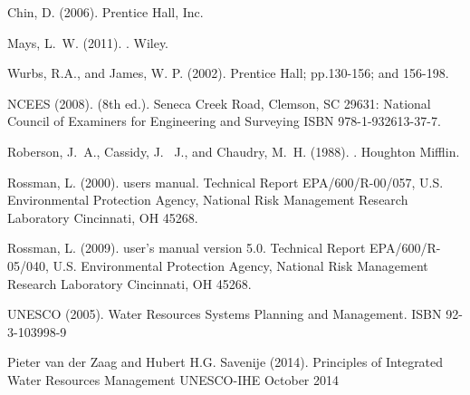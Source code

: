 \documentclass[12pt]{article}
\begin{document}
\begin{thebibliography}{}
Chin, D. (2006). 
\newblock Prentice Hall, Inc.

Mays, L.~W. (2011).
.
\newblock Wiley.

Wurbs, R.A., and James, W. P. (2002).
\newblock Prentice Hall; pp.130-156; and 156-198. 

NCEES (2008).
 (8th
  ed.).
 Seneca Creek Road, Clemson, SC 29631: National Council of
  Examiners for Engineering and Surveying {ISBN 978-1-932613-37-7}.

Roberson, J.~A., Cassidy, J. ~J., and Chaudry, M.~H.  (1988).
.
\newblock Houghton Mifflin.

Rossman, L. (2000).
 users manual.
\newblock Technical Report EPA/600/R-00/057, U.S. Environmental Protection
  Agency, National Risk Management Research Laboratory Cincinnati, OH 45268.
  
Rossman, L. (2009).
 user's manual version 5.0.
\newblock Technical Report EPA/600/R-05/040, U.S. Environmental Protection
  Agency, National Risk Management Research Laboratory Cincinnati, OH 45268.
  
UNESCO (2005).
\newblock Water Resources Systems Planning and Management.
\newblock ISBN 92-3-103998-9 

Pieter van der Zaag and Hubert H.G. Savenije (2014). 
\newblock Principles of Integrated Water Resources Management
\newblock UNESCO-IHE October 2014


\end{thebibliography}
\end{document}
